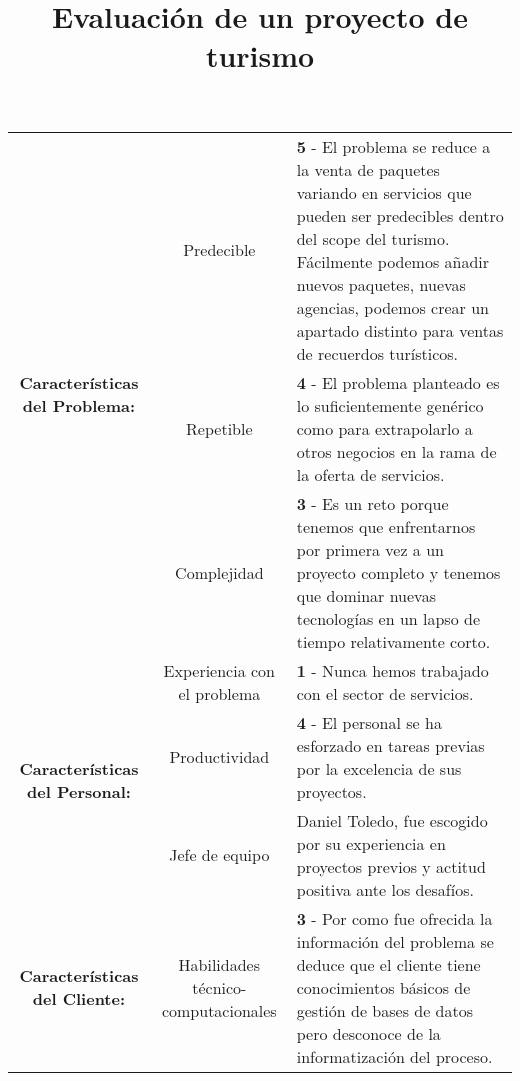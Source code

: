 \documentclass[10pt,a4paper]{article}
\title{Evaluación de un proyecto de turismo}
\begin{document}
\begin{center}    
    \begin{table}[t]
        \begin{tabular}{|c|c|m{5cm}|}
            \cline{1-3}
            \multirow{3}{*}{\textbf{Características del Problema:}}     
            & Predecible                 
            &  
            \textbf{5} - El problema se reduce a la venta de paquetes variando en servicios que pueden ser 
            predecibles dentro del scope del turismo. Fácilmente podemos añadir nuevos paquetes, nuevas agencias, 
            podemos crear un apartado distinto para ventas de recuerdos turísticos.
            \\ \cline{2-3}
            
            & Repetible                             
            &
            \textbf{4} - El problema planteado es lo suficientemente genérico como para extrapolarlo a otros 
            negocios en la rama de la oferta de servicios.
            \\ \cline{2-3}
            
            & Complejidad                           
            & 
            \textbf{3} - Es un reto porque tenemos que enfrentarnos por primera vez a un proyecto 
            completo y tenemos que dominar nuevas tecnologías en un lapso de tiempo relativamente corto.
            
            \\ \cline{1-3}
            
            \multirow{3}{*}{\textbf{Características del Personal:}}      
            & Experiencia con el problema          
            & 
            \textbf{1} - Nunca hemos trabajado con el sector de servicios.
            \\ \cline{2-3}
            
            & Productividad                         
            & 
            \textbf{4} - El personal se ha esforzado en tareas previas por la excelencia de sus proyectos.  
            \\ \cline{2-3}
            
            & Jefe de equipo                        
            & Daniel Toledo, fue escogido por su experiencia en proyectos previos y actitud positiva 
            ante los desafíos.
            \\ \cline{1-3}

            \multirow{3}{*}{\textbf{Características del Cliente:}}       
            & Habilidades técnico-computacionales   
            &
            \textbf{3} - Por como fue ofrecida la información del problema se deduce que el cliente tiene 
            conocimientos básicos de gestión de bases de datos pero desconoce de la informatización del proceso.
            \\ \cline{2-3}
            

\end{tabular}
\end{table}
\end{center}
\end{document}
